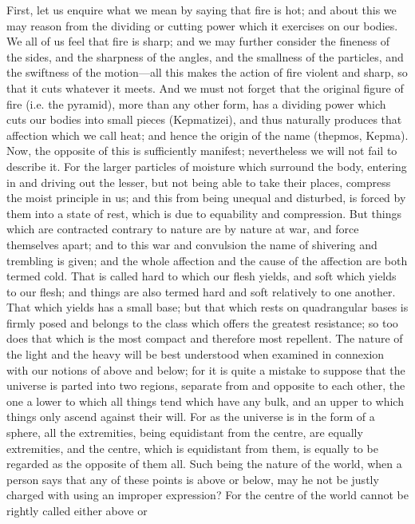 First, let us enquire what we mean by saying that fire is hot; and about
this we may reason from the dividing or cutting power which it exercises
on our bodies. We all of us feel that fire is sharp; and we may further
consider the fineness of the sides, and the sharpness of the angles, and
the smallness of the particles, and the swiftness of the motion—all
this makes the action of fire violent and sharp, so that it cuts whatever
it meets. And we must not forget that the original figure of fire (i.e.
the pyramid), more than any other form, has a dividing power which cuts
our bodies into small pieces (Kepmatizei), and thus naturally produces
that affection which we call heat; and hence the origin of the name
(thepmos, Kepma). Now, the opposite of this is sufficiently manifest;
nevertheless we will not fail to describe it. For the larger particles of
moisture which surround the body, entering in and driving out the lesser,
but not being able to take their places, compress the moist principle in
us; and this from being unequal and disturbed, is forced by them into a
state of rest, which is due to equability and compression. But things
which are contracted contrary to nature are by nature at war, and force
themselves apart; and to this war and convulsion the name of shivering and
trembling is given; and the whole affection and the cause of the affection
are both termed cold. That is called hard to which our flesh yields, and
soft which yields to our flesh; and things are also termed hard and soft
relatively to one another. That which yields has a small base; but that
which rests on quadrangular bases is firmly posed and belongs to the class
which offers the greatest resistance; so too does that which is the most
compact and therefore most repellent. The nature of the light and the
heavy will be best understood when examined in connexion with our notions
of above and below; for it is quite a mistake to suppose that the universe
is parted into two regions, separate from and opposite to each other, the
one a lower to which all things tend which have any bulk, and an upper to
which things only ascend against their will. For as the universe is in the
form of a sphere, all the extremities, being equidistant from the centre,
are equally extremities, and the centre, which is equidistant from them,
is equally to be regarded as the opposite of them all. Such being the
nature of the world, when a person says that any of these points is above
or below, may he not be justly charged with using an improper expression?
For the centre of the world cannot be rightly called either above or
